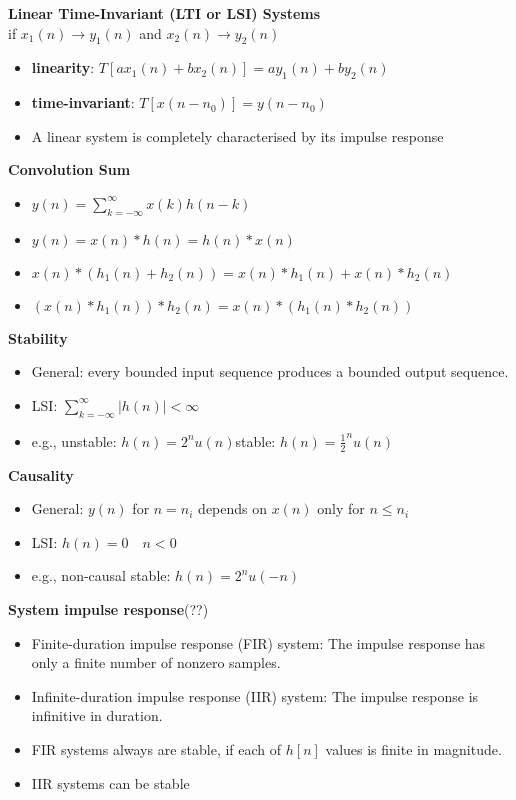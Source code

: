 \documentclass{../cheat}
\begin{document}
\begin{multicols}{3}
		\textbf{Linear Time-Invariant (LTI or LSI) Systems}\\
		if $x_1(n) \rightarrow y_1(n)$ and  $x_2(n) \rightarrow y_2(n)$
		\begin{itemize}[nolistsep, leftmargin=1em]
			\item \textbf{linearity}:	$T[ax_1(n) + bx_2(n)] = ay_1(n) + by_2(n)$
			\item \textbf{time-invariant}:	$T[x(n-n_0)] = y(n-n_0)$
			\item A linear system is completely characterised by its impulse response
		\end{itemize}

		
		\textbf{Convolution Sum}
		\begin{itemize}
			\item $y(n)=\sum_{k=-\infty}^{\infty}x(k) h(n-k)$
			\item $y(n) = x(n) \ast h(n) = h(n) \ast x(n)$
			\item $x(n) \ast (h_1(n) + h_2(n))=x(n) \ast h_1(n) + x(n) \ast h_2(n)$
			\item $(x(n) \ast h_1(n)) \ast h_2(n) = x(n) \ast (h_1(n) \ast h_2(n))$
		\end{itemize}
		
		\textbf{Stability}
		\begin{itemize}
			\item General: every bounded input sequence produces a bounded output sequence.
			\item LSI: $\sum_{k=-\infty}^{\infty} |h(n)| < \infty$
			\item e.g., unstable: $h(n)=2^n u(n)$\hfill stable: $h(n)=\frac{1}{2}^n u(n)$
		\end{itemize}
		
		\textbf{Causality}
		\begin{itemize}
			\item General: $y(n)$ for $n=n_i$ depends on $x(n)$ only for $n \leq n_i$
			\item LSI: $h(n)=0 \quad n<0$
			\item e.g., non-causal stable: $h(n)=2^n u(-n)$
		\end{itemize}
		
		\textbf{System impulse response}(??)
		\begin{itemize}
			\item Finite-duration impulse response (FIR) system: The impulse response has only a finite number of nonzero samples.
			\item Infinite-duration impulse response (IIR) system: The impulse response is infinitive in duration.
			\item FIR systems always are stable, if each of $h[n]$ values is finite in magnitude.
			\item IIR systems can be stable
		\end{itemize}
		

\end{multicols}
\end{document}
